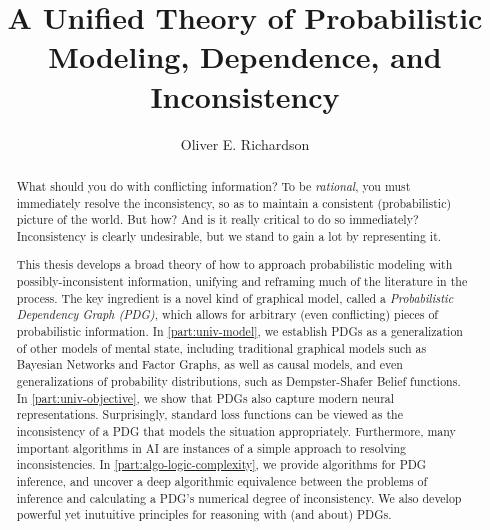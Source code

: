 \documentclass[tocprelim,
    ]{cornellmodified}
\title {%
    A Unified Theory of Probabilistic Modeling, 
        Dependence, and Inconsistency
}
\author {Oliver E. Richardson}
\begin{document}
\maketitle
\makecopyright

\begin{abstract}
%

What should you do with conflicting information?
To be \emph{rational}, you must immediately resolve the inconsistency,
    so as to maintain a consistent (probabilistic) picture of the world.
%
But how?
And is it really critical to do so immediately?
Inconsistency is clearly undesirable, but we stand to gain a lot by representing it.
%

This thesis develops a broad theory of how to approach probabilistic modeling with possibly-inconsistent information, unifying and reframing much of the literature in the process.  
The key ingredient is a novel kind of graphical model, called a \emph{Probabilistic Dependency Graph (PDG)},
which allows for arbitrary (even conflicting) pieces of probabilistic information. 
In \cref{part:univ-model}, we establish PDGs as a generalization of other models of mental state, including traditional graphical models such as Bayesian Networks and Factor Graphs, as well as causal models, and even generalizations of probability distributions, such as Dempster-Shafer Belief functions. 
In \cref{part:univ-objective}, we show that PDGs also capture modern neural representations.
Surprisingly, standard loss functions can be viewed as the inconsistency of a PDG that models the situation appropriately. 
Furthermore, many important algorithms in AI are instances of a simple approach to resolving inconsistencies. 
In \cref{part:algo-logic-complexity}, we provide algorithms for PDG inference, and uncover a deep algorithmic equivalence between the problems of inference and calculating a PDG's numerical degree of inconsistency. 
We also develop powerful yet inutuitive principles for reasoning with (and about) PDGs. 
\end{abstract}
\end{document}
